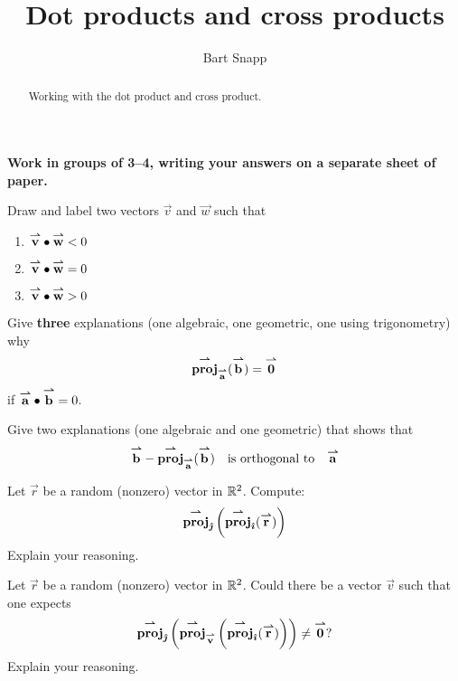 \documentclass[nooutcomes,noauthor]{ximera}
\author{Bart Snapp}
\title[Collaborate:]{Dot products and cross products}
\begin{document}
\begin{abstract}
  Working with the dot product and cross product. 
\end{abstract}
\maketitle

\textbf{Work in groups of 3--4, writing your answers on a separate
  sheet of paper.}

\begin{problem}
  Draw and label two vectors $\vec{v}$ and $\vec{w}$ such that
  \begin{multicols}{3}
  \begin{enumerate}
  \item $\vec{v}\dotp\vec{w} <0$
  \item $\vec{v}\dotp\vec{w} =0$
  \item $\vec{v}\dotp\vec{w} >0$
  \end{enumerate}
  \end{multicols}
\end{problem}

\begin{problem}
  Give \textbf{three} explanations (one algebraic, one geometric, one
  using trigonometry) why
  \[
  \proj_{\vec{a}}(\vec{b}) = \vec{0}
  \]
  if $\vec{a}\dotp\vec{b} = 0$.
\end{problem}

\begin{problem}
  Give two explanations (one algebraic and one geometric) that shows
  that
  \[
  \vec{b} - \proj_{\vec{a}}(\vec{b}) \quad\text{is orthogonal to}\quad \vec{a}
  \]
\end{problem}


\begin{problem}
  Let $\vec{r}$ be a random (nonzero) vector in $\R^2$. Compute:
  \[
  \proj_\vecj\left(\proj_\veci(\vec{r})\right)
  \]
  Explain your reasoning.
\end{problem}

\begin{problem}
  Let $\vec{r}$ be a random (nonzero) vector in $\R^2$. Could there be
  a vector $\vec{v}$ such that one expects
  \[
  \proj_\vecj\left(\proj_{\vec{v}}\left(\proj_\veci(\vec{r})\right)\right)\ne \vec{0}?
  \]
  Explain your reasoning.
\end{problem}
\end{document}
